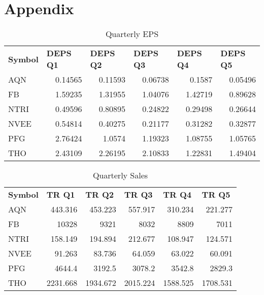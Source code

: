 \documentclass{article}
\begin{document}
\section{Appendix}
\begin{table}[htbp]
  \caption{Quarterly EPS}
   \begin{tabular}{lrrrrr}
    \textbf{Symbol} & \multicolumn{1}{l}{\textbf{DEPS Q1}} & \multicolumn{1}{l}{\textbf{DEPS Q2}} & \multicolumn{1}{l}{\textbf{DEPS Q3}} & \multicolumn{1}{l}{\textbf{DEPS Q4}} & \multicolumn{1}{l}{\textbf{DEPS Q5}} \\
    AQN   & 0.14565 & 0.11593 & 0.06738 & 0.1587 & 0.05496 \\
    FB    & 1.59235 & 1.31955 & 1.04076 & 1.42719 & 0.89628 \\
    NTRI  & 0.49596 & 0.80895 & 0.24822 & 0.29498 & 0.26644 \\
    NVEE  & 0.54814 & 0.40275 & 0.21177 & 0.31282 & 0.32877 \\
    PFG   & 2.76424 & 1.0574 & 1.19323 & 1.08755 & 1.05765 \\
    THO   & 2.43109 & 2.26195 & 2.10833 & 1.22831 & 1.49404 \\
    \end{tabular}%
  \label{tab:addlabel}%
\end{table}%

\begin{table}[htbp]
  \caption{Quarterly Sales}
    \begin{tabular}{lrrrrr}
    \textbf{Symbol} & \multicolumn{1}{l}{\textbf{TR Q1}} & \multicolumn{1}{l}{\textbf{TR Q2}} & \multicolumn{1}{l}{\textbf{TR Q3}} & \multicolumn{1}{l}{\textbf{TR Q4}} & \multicolumn{1}{l}{\textbf{TR Q5}} \\
    AQN   & 443.316 & 453.223 & 557.917 & 310.234 & 221.277 \\
    FB    & 10328 & 9321  & 8032  & 8809  & 7011 \\
    NTRI  & 158.149 & 194.894 & 212.677 & 108.947 & 124.571 \\
    NVEE  & 91.263 & 83.736 & 64.059 & 63.022 & 60.091 \\
    PFG   & 4644.4 & 3192.5 & 3078.2 & 3542.8 & 2829.3 \\
    THO   & 2231.668 & 1934.672 & 2015.224 & 1588.525 & 1708.531 \\
    \end{tabular}%
  \label{tab:addlabel}%
\end{table}%
\end{document}
